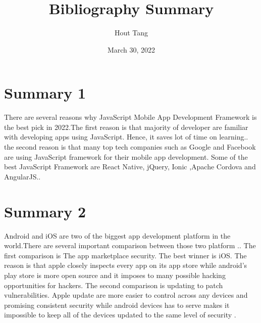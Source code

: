 \documentclass{article}
\title{Bibliography Summary}
\author{Hout Tang}
\date{March 30, 2022}
\begin{document}
\maketitle

\section*{Summary 1}
There are several reasons why JavaScript Mobile App Development Framework is the best pick in 2022.The first reason is that majority of developer are familiar with developing apps using JavaScript. Hence, it saves lot of time on learning.\cite{AparnaArticle}. the second reason is that many top tech companies such as Google and Facebook are using JavaScript framework for their mobile app development. Some of the best JavaScript Framework are React Native, jQuery, Ionic ,Apache Cordova and AngularJS.\cite{AparnaArticle}.




\medskip

\section*{Summary 2}

Android and iOS are two of the biggest app development platform in the world.There are several important comparison between those two platform .\cite{DanielArticle}. The first comparison is The app marketplace security. The best winner is iOS. The reason is that apple closely inspects every app on its app store while android's play store is more open source and it imposes to many possible hacking opportunities for hackers. The second comparison is updating to patch vulnerabilities. Apple update are more easier to control across any devices and promising consistent security while android devices has to serve makes it impossible to keep all of the devices updated to the same level of security \cite{DanielArticle}.


\printbibliography
\end{document}
